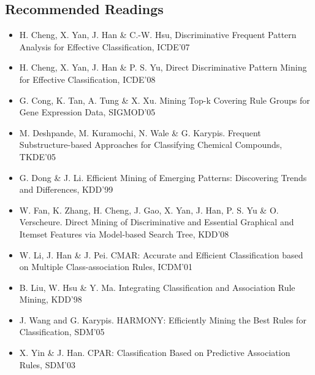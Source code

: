 \subsection{Recommended Readings}
\begin{itemize}
\item H. Cheng, X. Yan, J. Han \& C.-W. Hsu, Discriminative Frequent Pattern Analysis for Effective Classification, ICDE'07
\item H. Cheng, X. Yan, J. Han \& P. S. Yu, Direct Discriminative Pattern Mining for Effective Classification, ICDE’08
\item G. Cong, K. Tan, A. Tung \& X. Xu. Mining Top-k Covering Rule Groups for Gene Expression Data, SIGMOD’05
\item M. Deshpande, M. Kuramochi, N. Wale \& G. Karypis. Frequent Substructure-based Approaches for Classifying Chemical Compounds, TKDE’05
\item G. Dong \& J. Li. Efficient Mining of Emerging Patterns: Discovering Trends and Differences, KDD’99
\item W. Fan, K. Zhang, H. Cheng, J. Gao, X. Yan, J. Han, P. S. Yu \& O. Verscheure. Direct Mining of
Discriminative and Essential Graphical and Itemset Features via Model-based Search Tree, KDD’08
\item W. Li, J. Han \& J. Pei. CMAR: Accurate and Efficient Classification based on Multiple Class-association Rules, ICDM’01
\item B. Liu, W. Hsu \& Y. Ma. Integrating Classification and Association Rule Mining, KDD’98
\item J. Wang and G. Karypis. HARMONY: Efficiently Mining the Best Rules for Classification, SDM’05
\item X. Yin \& J. Han. CPAR: Classification Based on Predictive Association Rules, SDM’03
\end{itemize}

